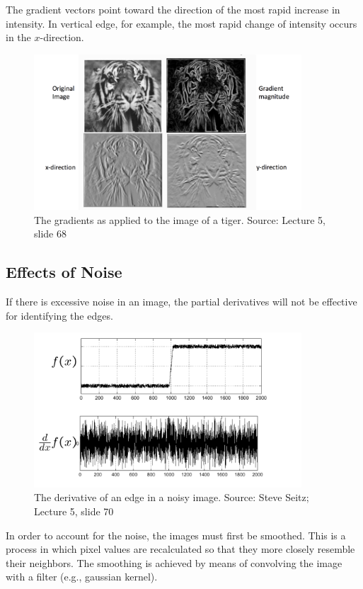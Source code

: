 \documentclass{article}
\begin{document}
The gradient vectors point toward the direction of the most rapid increase in intensity. In vertical edge, for example, the most rapid change of intensity occurs in the $x$-direction.

\begin{figure}[H]
\centering
\includegraphics[width=10cm]{lazebnik_tiger.png}
\caption{The gradients as applied to the image of a tiger. Source: Lecture 5, slide 68}
\end{figure}

\subsection{Effects of Noise}

If there is excessive noise in an image, the partial derivatives will not be effective for identifying the edges. \newline

\begin{figure}[H]
\centering
\includegraphics[width=10cm]{seitz_noise.png}
\caption{The derivative of an edge in a noisy image. Source: Steve Seitz; Lecture 5, slide 70}
\end{figure}

In order to account for the noise, the images must first be smoothed. This is a process in which pixel values are recalculated so that they more closely resemble their neighbors. The smoothing is achieved by means of convolving the image with a filter (e.g., gaussian kernel). \newline
\end{document}
